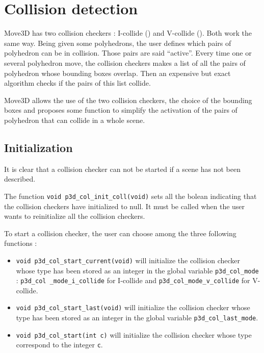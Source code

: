 \chapter{Collision detection}

Move3D has two collision checkers : I-collide  (\cite{LINMANOCH95})
and V-collide (\cite{LINMANOCH97}). Both work the same way. Being
given some polyhedrons, the user defines which pairs of polyhedron can
be in collision. Those pairs are said ``activ{e}''. Every time one or
several polyhedron move, the collision checkers makes a list of all
the pairs of polyhedron whose bounding boxes overlap. Then an
expensive but exact algorithm checks if the pairs of this list
collide. 

Move3D allows the use of the two collision checkers, the choice of the
bounding boxes and proposes some function to simplify the activation
of the pairs of polyhedron that can collide in a whole scene.

\section{Initialization}

It is clear that a collision checker can not be started if a scene has
not been described.

The function {\tt void p3d\_col\_init\_coll(void)}
 sets all the
bolean indicating that the collision checkers have initialized to
null. It must be called when the user wants to reinitialize all the
collision checkers.

To start a collision checker, the user can choose among the three
following functions :

\begin{itemize}
\item {\tt void p3d\_col\_start\_current(void)}
 will initialize
the collision checker whose type has been stored as an integer in the global
variable {\tt p3d\_col\_mode} : {\tt p3d\_col \_mode\_i\_collide} for
I-collide and {\tt p3d\_col\_mode\_v\_collide} for V-collide.
\item {\tt void p3d\_col\_start\_last(void)}
 will initialize
the collision checker whose type has been stored as an integer in the global
variable {\tt p3d\_col\_last\_mode}.
\item {\tt void p3d\_col\_start(int c)}  will initialize
the collision checker whose type correspond to the integer {\tt c}.
\end{itemize}

